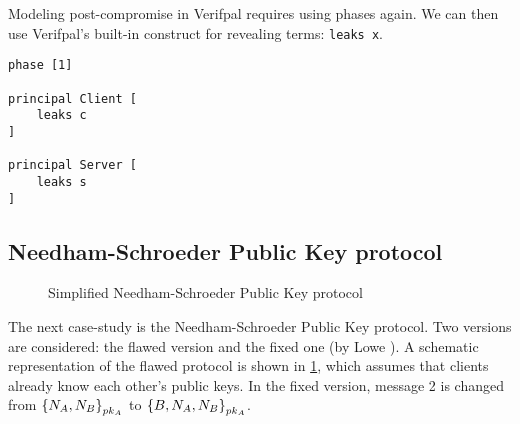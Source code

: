 \lstset{language=verifpal}
Modeling post-compromise in Verifpal requires using phases again. We can then use Verifpal's built-in construct for revealing terms: \lstinline{leaks x}.
\newpage
\begin{lstlisting}
phase [1]

principal Client [
    leaks c
]

principal Server [
    leaks s
]
\end{lstlisting}

\subsection{Needham-Schroeder Public Key protocol}
\label{sec:NSPK}

\begin{figure}[t]
    \setmscoptions
    \begin{msc}{}



        \nextlevel[4]


        \nextlevel[3]
        \nextlevel



        \nextlevel[3]
        \nextlevel[2]

    \end{msc}

    \centering
    \caption{Simplified Needham-Schroeder Public Key protocol}
    \label{fig:NSPK}
\end{figure}

The next case-study is the Needham-Schroeder Public Key protocol. Two versions are considered: the flawed version and the fixed one (by Lowe \cite{NSPK_LoweGavin}). A schematic representation of the flawed protocol is shown in \cref{fig:NSPK}, which assumes that clients already know each other's public keys. In the fixed version, message 2 is changed from $\left\{N_A, N_B\right\}_{pk_{A}}$ to $\left\{B, N_A, N_B\right\}_{pk_{A}}$.

